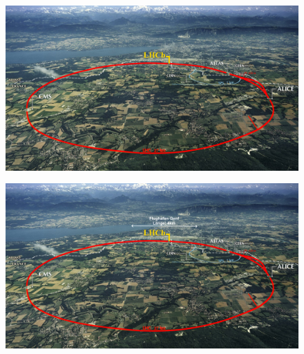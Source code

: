 \begin{frame}
\begin{figure}
\includegraphics[width=\textwidth]{Figures Introductory Lecture/LHCb Detector/LHC.jpg}
\end{figure}
\end{frame}
\begin{frame}\addtocounter{framenumber}{-1}
\begin{figure}
\includegraphics[width=\textwidth]{Figures Introductory Lecture/LHCb Detector/LHC+GVA_DE.jpg}
\end{figure}
\end{frame}
